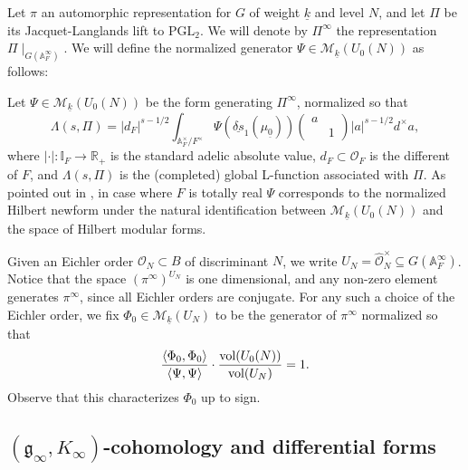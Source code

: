 \documentclass{amsart}
\theoremstyle{definition}
\theoremstyle{remark}
\numberwithin{equation}{section}
\newcommand{\PGL}{{\mathrm{PGL}}}
\newcommand{\A}{{\mathbb A}}
\newcommand{\R}{{\mathbb R}}
\newcommand{\I}{{\mathbb I}}
\newcommand{\cM}{{\mathcal M}}
\newcommand{\cO}{{\mathcal O}}
\newcommand{\mfg}{{\mathfrak g}}
\begin{document}
Let $\pi$ an automorphic representation for $G$ of weight $\underline k$ and level $N$, and let $\Pi$ be its Jacquet-Langlands lift to $\PGL_2$. We will denote by $\Pi^\infty$ the representation $\Pi\mid_{G(\A_F^\infty)}$. We will define the normalized generator $\Psi\in \cM_{\underline k}(U_0(N))$ as follows:

Let $\Psi\in \cM_{\underline k}(U_0(N))$ be the form generating $\Pi^\infty$, normalized so that 
\begin{equation}\label{eqdefPsi}
\Lambda(s,\Pi)=|d_F|^{s-1/2}\int_{\A_F^\times/F^\times}\Psi(\underline {\delta s}_1(\mu_{\underline 0}))\left(\begin{array}{cc}a&\\&1\end{array}\right)|a|^{s-1/2}d^\times a,
\end{equation}
where $|\cdot|:\I_F\rightarrow\R_+$ is the standard adelic absolute value, $d_F\subset\cO_F$ is the different of $F$, and $\Lambda(s,\Pi)$ is the (completed) global L-function associated with $\Pi$. 
As pointed out in \cite[\S 3.2]{preprintsanti2}, in case where $F$ is totally real $\Psi$ corresponds to the normalized Hilbert newform under the natural identification between $\cM_{\underline k}(U_0(N))$ and the space of Hilbert modular forms.



Given an Eichler order $\cO_N\subset B$ of discriminant $N$, we write $U_N=\hat\cO_N^\times\subseteq G(\A_F^\infty)$. Notice that the space $(\pi^\infty)^{U_N}$ is one dimensional, and any non-zero element generates $\pi^\infty$, since all Eichler orders are conjugate. For any such a choice of the Eichler order, we fix $\Phi_0\in \cM_{\underline k}(U_N)$ to be the generator of $\pi^\infty$ normalized so that 
\begin{equation}\label{condnormalization}
\frac{\langle \Phi_0,\Phi_0\rangle}{\langle \Psi,\Psi\rangle}\cdot\frac{{\rm vol}(U_0(N))}{{\rm vol}(U_N)}=1.
\end{equation}
Observe that this characterizes $\Phi_0$ up to sign.

\subsection{$(\mfg_\infty,K_\infty)$-cohomology and differential forms}
\end{document}
